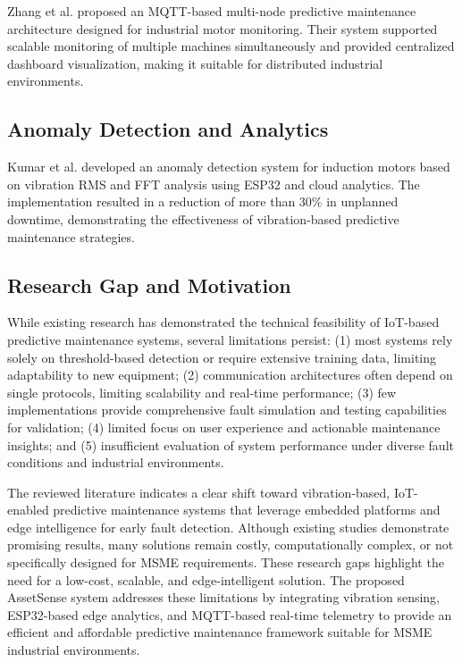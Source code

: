 \documentclass[conference]{IEEEtran}
\begin{document}
Zhang et al. \cite{zhang2024} proposed an MQTT-based multi-node predictive maintenance architecture designed for industrial motor monitoring. Their system supported scalable monitoring of multiple machines simultaneously and provided centralized dashboard visualization, making it suitable for distributed industrial environments.

\subsection{Anomaly Detection and Analytics}

Kumar et al. \cite{kumar2024} developed an anomaly detection system for induction motors based on vibration RMS and FFT analysis using ESP32 and cloud analytics. The implementation resulted in a reduction of more than 30\% in unplanned downtime, demonstrating the effectiveness of vibration-based predictive maintenance strategies.

\subsection{Research Gap and Motivation}

While existing research has demonstrated the technical feasibility of IoT-based predictive maintenance systems, several limitations persist: (1) most systems rely solely on threshold-based detection or require extensive training data, limiting adaptability to new equipment; (2) communication architectures often depend on single protocols, limiting scalability and real-time performance; (3) few implementations provide comprehensive fault simulation and testing capabilities for validation; (4) limited focus on user experience and actionable maintenance insights; and (5) insufficient evaluation of system performance under diverse fault conditions and industrial environments.

The reviewed literature indicates a clear shift toward vibration-based, IoT-enabled predictive maintenance systems that leverage embedded platforms and edge intelligence for early fault detection. Although existing studies demonstrate promising results, many solutions remain costly, computationally complex, or not specifically designed for MSME requirements. These research gaps highlight the need for a low-cost, scalable, and edge-intelligent solution. The proposed AssetSense system addresses these limitations by integrating vibration sensing, ESP32-based edge analytics, and MQTT-based real-time telemetry to provide an efficient and affordable predictive maintenance framework suitable for MSME industrial environments.
\end{document}
